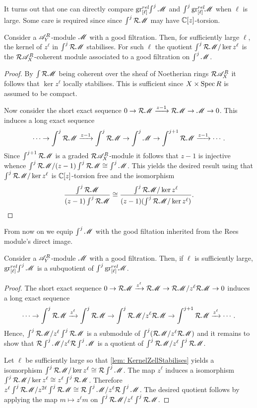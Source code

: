 It turns out that one can directly compare $\operatorname{gr}_{[\ell]}^{rel}\mkern-5mu\int^j\mathscr{M}$ and $\int^j \operatorname{gr}_{[\ell]}^{rel}\mkern-5mu\mathscr{M}$ when $\ell$ is large. Some care is required since since $\int^j \mathcal{R} \mathscr{M}$ may have $\mathbb{C}[z]$-torsion.
\begin{lemma}\label{lem: KernelZellStabilises}
  Consider a $\mathscr{A}_Y^R$-module $\mathscr{M}$ with a good filtration. Then, for sufficiently large $\ell$, the kernel of $z^\ell$ in $\int^j \mathcal{R} \mathscr{M}$ stabilises. For such $\ell$ the quotient $\int^j \mathcal{R} \mathscr{M}/ \ker z^\ell$ is the $\mathcal{R} \mathscr{A}_X^R$-coherent module associated to a good filtration on $\int^j \mathscr{M}$.
\end{lemma}
\begin{proof}
  By $\int \mathcal{R} \mathscr{M}$ being coherent over the sheaf of Noetherian rings $\mathcal{R}\mathscr{A}_X^R$ it follows that $\ker z^\ell$ locally stabilises. This is sufficient since $X\times \operatorname{Spec} R$ is assumed to be compact.

    Now consider the short exact sequence $0\to \mathcal{R} \mathscr{M} \xrightarrow{z-1} \mathcal{R} \mathscr{M} \to \mathscr{M} \to 0$. This induces a long exact sequence
    $$\cdots \to \int^j \mathcal{R} \mathscr{M} \xrightarrow{z-1} \int^j \mathcal{R} \mathscr{M} \to \int^j \mathscr{M} \to \int^{j+1} \mathcal{R} \mathscr{M} \xrightarrow{z-1}\cdots. $$
    Since $\int^{j+1} \mathcal{R} \mathscr{M}$ is a graded $\mathcal{R}\mathscr{A}_X^R$-module it follows that $z-1$ is injective whence $\int^j \mathcal{R} \mathscr{M} / (z-1)\int^j \mathcal{R} \mathscr{M} \cong \int^j \mathscr{M}$. This yields the desired result using that $\int^j \mathcal{R} \mathscr{M} / \ker z^\ell$ is $\mathbb{C}[z]$-torsion free and the isomorphism
    $$ \frac{\int^j \mathcal{R} \mathscr{M} }{(z-1)\int^j \mathcal{R} \mathscr{M} } \cong \frac{\int^j \mathcal{R} \mathscr{M} /\ker z^\ell }{(z-1)(\int^j \mathcal{R} \mathscr{M}/\ker z^\ell) }.$$
\end{proof}
From now on we equip $\int^j \mathscr{M}$ with the good filtation inherited from the Rees module's direct image.
\begin{lemma}\label{lem: EllLargeSubquotent}
    Consider a $\mathscr{A}_Y^R$-module $\mathscr{M}$ with a good filtration. Then, if $\ell$ is sufficiently large, $\operatorname{gr}_{[\ell]}^{rel}\mkern-5mu \int^j\mathscr{M}$ is a subquotient of $\int^j\operatorname{gr}_{[\ell]}^{rel}\mkern-5mu\mathscr{M}$.
\end{lemma}
\begin{proof}
  The short exact sequence $0\to \mathcal{R}\mathscr{M} \xrightarrow{z^\ell}\mathcal{R} \mathscr{M} \to \mathcal{R}\mathscr{M} / z^\ell \mathcal{R}\mathscr{M} \to 0$ induces a long exact sequence
  $$\cdots \to \int^j \mathcal{R} \mathscr{M} \xrightarrow{z^\ell} \int^j \mathcal{R} \mathscr{M} \to \int^j \mathcal{R}\mathscr{M}/z^\ell \mathcal{R}\mathscr{M} \to \int^{j+1} \mathcal{R} \mathscr{M} \xrightarrow{z^\ell}\cdots. $$
  Hence, $\int^j \mathcal{R} \mathscr{M} / z^\ell \int^j \mathcal{R} \mathscr{M}$ is a submodule of $\int^j (\mathcal{R}\mathscr{M}/z^\ell \mathcal{R}\mathscr{M})$ and it remains to show that $\mathcal{R} \int^j \mathscr{M}/ z^\ell \mathcal{R} \int^j \mathscr{M}$ is a quotient of $\int^j \mathcal{R} \mathscr{M} / z^\ell \int^j \mathcal{R} \mathscr{M}$.

  Let $\ell$ be sufficiently large so that \cref{lem: KernelZellStabilises} yields a isomorphism $\int^j \mathcal{R} \mathscr{M} / \ker z^\ell \cong \mathcal{R}\int^j \mathscr{M}$. The map $z^\ell$ induces a isomorphism $\int^j \mathcal{R} \mathscr{M} / \ker z^\ell \cong z^\ell \int^j \mathcal{R} \mathscr{M}$. Therefore $z^\ell \int^j \mathcal{R} \mathscr{M} / z^{2\ell}\int^j \mathcal{R}\mathscr{M} \cong \mathcal{R} \int^j \mathscr{M} / z^\ell \mathcal{R}\int^j \mathscr{M} $.
  The desired quotient follows by applying the map $m\mapsto z^\ell m$ on $\int^j \mathcal{R} \mathscr{M} / z^\ell \int^j \mathcal{R} \mathscr{M}$.
\end{proof}
